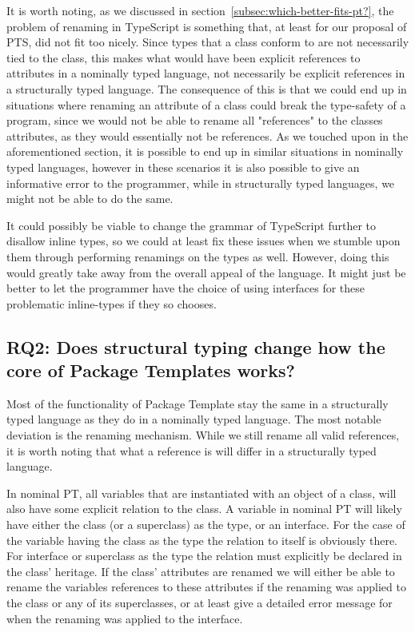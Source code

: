 It is worth noting, as we discussed in section~\vref{subsec:which-better-fits-pt?}, the problem of renaming in TypeScript is something that, at least for our proposal of PTS, did not fit too nicely.
Since types that a class conform to are not necessarily tied to the class, this makes what would have been explicit references to attributes in a nominally typed language, not necessarily be explicit references in a structurally typed language.
The consequence of this is that we could end up in situations where renaming an attribute of a class could break the type-safety of a program, since we would not be able to rename all "references" to the classes attributes, as they would essentially not be references.
As we touched upon in the aforementioned section, it is possible to end up in similar situations in nominally typed languages, however in these scenarios it is also possible to give an informative error to the programmer, while in structurally typed languages, we might not be able to do the same.

It could possibly be viable to change the grammar of TypeScript further to disallow inline types, so we could at least fix these issues when we stumble upon them through performing renamings on the types as well.
However, doing this would greatly take away from the overall appeal of the language.
It might just be better to let the programmer have the choice of using interfaces for these problematic inline-types if they so chooses.

\subsection*{RQ2: Does structural typing change how the core of Package Templates works?}

Most of the functionality of Package Template stay the same in a structurally typed language as they do in a nominally typed language.
The most notable deviation is the renaming mechanism.
While we still rename all valid references, it is worth noting that what a reference is will differ in a structurally typed language.

In nominal PT, all variables that are instantiated with an object of a class, will also have some explicit relation to the class.
A variable in nominal PT will likely have either the class (or a superclass) as the type, or an interface.
For the case of the variable having the class as the type the relation to itself is obviously there.
For interface or superclass as the type the relation must explicitly be declared in the class' heritage.
If the class' attributes are renamed we will either be able to rename the variables references to these attributes if the renaming was applied to the class or any of its superclasses, or at least give a detailed error message for when the renaming was applied to the interface.

